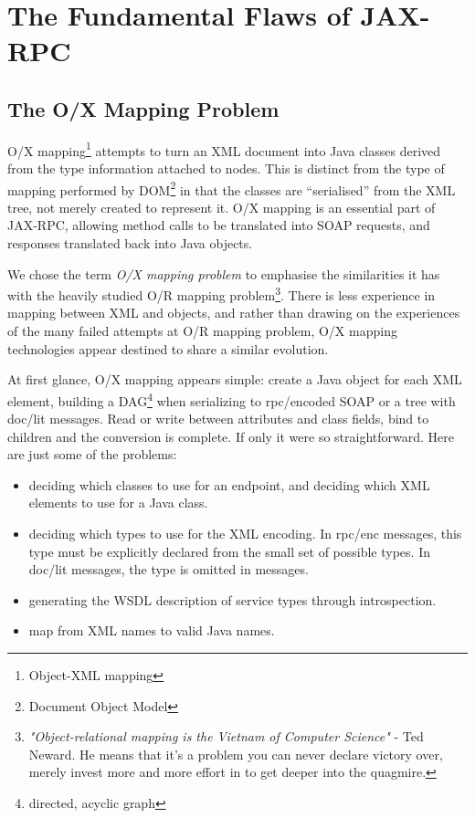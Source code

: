 \section{The Fundamental Flaws of JAX-RPC}
\label{objections:top}

\subsection{The O/X Mapping Problem}
\label{objections:o-x}

O/X mapping\footnote{Object-XML mapping} attempts to turn an XML
document into Java classes derived from the type information attached
to nodes. This is distinct from the type of mapping performed by
DOM\footnote{Document Object Model} in that the classes are
``serialised'' from the XML tree, not merely created to represent it. 
O/X mapping is an essential part of JAX-RPC, allowing method calls to
be translated into SOAP requests, and responses translated back into
Java objects.

We chose the term \emph{O/X mapping problem} to emphasise the
similarities it has with the heavily studied O/R mapping
problem\footnote{ \emph{"Object-relational mapping is the Vietnam of
Computer Science"} - Ted Neward. He means that it's a problem you can
never declare victory over, merely invest more and more effort in to get
deeper into the quagmire.
}.  There is less experience in mapping between XML and objects, and
rather than drawing on the experiences of the many failed attempts at
O/R mapping problem, O/X mapping technologies appear destined to share
a similar evolution.

At first glance, O/X mapping appears simple: create a Java object
for each XML element, building a DAG\footnote{directed, acyclic graph}
when serializing to rpc/encoded SOAP or a tree with doc/lit
messages. Read or write between attributes and class fields, bind to
children and the conversion is complete. If only it were so
straightforward. Here are just some of the problems:


\begin{itemize}

\item deciding which classes to use for an endpoint, and
deciding which XML elements to use for a Java class. 

\item deciding which types to use for the XML encoding. In rpc/enc messages,
this type must be explicitly declared from the small set of possible types. In
doc/lit messages, the type is omitted in messages. 

\item generating the WSDL description of service types through introspection.

\item map from XML names to valid Java names.

\end{itemize}

